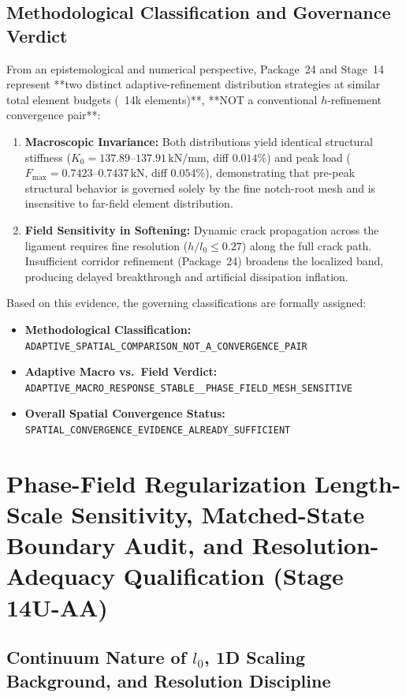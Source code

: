 \subsection{Methodological Classification and Governance Verdict}
\label{subsec:stage14uy_governance_verdict}

From an epistemological and numerical perspective, Package~24 and Stage~14 represent **two distinct adaptive-refinement distribution strategies at similar total element budgets (~14k elements)**, **NOT a conventional $h$-refinement convergence pair**:
\begin{enumerate}
  \item \textbf{Macroscopic Invariance:} Both distributions yield identical structural stiffness ($K_0 = 137.89\text{--}137.91\,\mathrm{kN/mm}$, diff $0.014\%$) and peak load ($F_{\max} = 0.7423\text{--}0.7437\,\mathrm{kN}$, diff $0.054\%$), demonstrating that pre-peak structural behavior is governed solely by the fine notch-root mesh and is insensitive to far-field element distribution.
  \item \textbf{Field Sensitivity in Softening:} Dynamic crack propagation across the ligament requires fine resolution ($h/l_0 \le 0.27$) along the full crack path. Insufficient corridor refinement (Package~24) broadens the localized band, producing delayed breakthrough and artificial dissipation inflation.
\end{enumerate}

Based on this evidence, the governing classifications are formally assigned:
\begin{itemize}
  \item \textbf{Methodological Classification:} \texttt{ADAPTIVE\_SPATIAL\_COMPARISON\_NOT\_A\_CONVERGENCE\_PAIR}
  \item \textbf{Adaptive Macro vs.\ Field Verdict:} \texttt{ADAPTIVE\_MACRO\_RESPONSE\_STABLE\_\_PHASE\_FIELD\_MESH\_SENSITIVE}
  \item \textbf{Overall Spatial Convergence Status:} \texttt{SPATIAL\_CONVERGENCE\_EVIDENCE\_ALREADY\_SUFFICIENT}
\end{itemize}

\section{Phase-Field Regularization Length-Scale Sensitivity, Matched-State Boundary Audit, and Resolution-Adequacy Qualification (Stage 14U-AA)}
\label{sec:stage14uaa_length_scale_sensitivity}

\subsection{Continuum Nature of $l_0$, 1D Scaling Background, and Resolution Discipline}
\label{subsec:stage14uaa_l0_nature}

